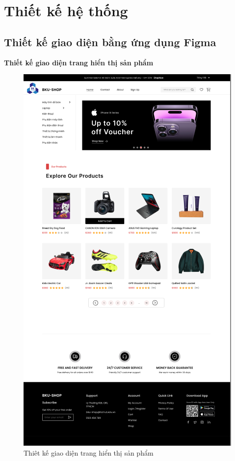 \chapter{Thiết kế hệ thống}
\section{Thiết kế giao diện bằng ứng dụng Figma}
\textbf{Thiết kế giao diện trang hiển thị sản phẩm}
\begin{figure}[H]
    \begin{center}
    \includegraphics[scale=0.8]{images/hieu/chap-4/display-product-page.png}
    \vspace*{5mm}
    \caption{Thiêt kế giao diện trang hiển thị sản phẩm}
    \end{center}
\end{figure}
